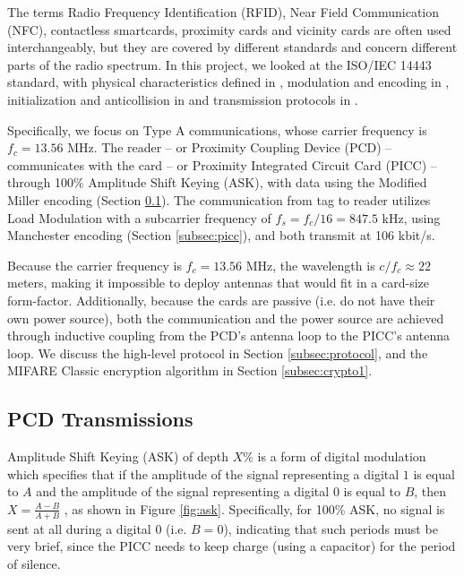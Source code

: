 \documentclass[fleqn,10pt]{SelfArx} %
\begin{document}
The terms Radio Frequency Identification (RFID), Near Field Communication (NFC), contactless smartcards, proximity cards and vicinity cards are often used interchangeably, but they are covered by different standards and concern different parts of the radio spectrum. In this project, we looked at the ISO/IEC 14443 standard, with physical characteristics defined in \cite{iso144431}, modulation and encoding in \cite{iso144432}, initialization and anticollision in \cite{iso144433} and transmission protocols in \cite{iso144434}.

Specifically, we focus on Type A communications, whose carrier frequency is $f_c=13.56$ MHz. The reader -- or Proximity Coupling Device (PCD) -- communicates with the card -- or Proximity Integrated Circuit Card (PICC) -- through 100\% Amplitude Shift Keying (ASK), with data using the Modified Miller encoding (Section \ref{subsec:pcd}). The communication from tag to reader utilizes Load Modulation with a subcarrier frequency of $f_s=f_c/16=847.5$ kHz, using Manchester encoding (Section \ref{subsec:picc}), and both transmit at 106 kbit/s. 

Because the carrier frequency is $f_c=13.56$ MHz, the wavelength is $c/f_c\approx22$ meters, making it impossible to deploy antennas that would fit in a card-size form-factor. Additionally, because the cards are passive (i.e. do not have their own power source), both the communication and the power source are achieved through inductive coupling from the PCD's antenna loop to the PICC's antenna loop. We discuss the high-level protocol in Section \ref{subsec:protocol}, and the MIFARE Classic encryption algorithm in Section \ref{subsec:crypto1}.

\subsection{PCD Transmissions}
\label{subsec:pcd}

Amplitude Shift Keying (ASK) of depth $X$\% is a form of digital modulation which specifies that if the amplitude of the signal representing a digital $1$ is equal to $A$ and the amplitude of the signal representing a digital $0$ is equal to $B$, then $X=\frac{A-B}{A+B}$ \cite{atmel}, as shown in Figure \ref{fig:ask}. Specifically, for 100\% ASK, no signal is sent at all during a digital $0$ (i.e. $B=0$), indicating that such periods must be very brief, since the PICC needs to keep charge (using a capacitor) for the period of silence.
\end{document}

